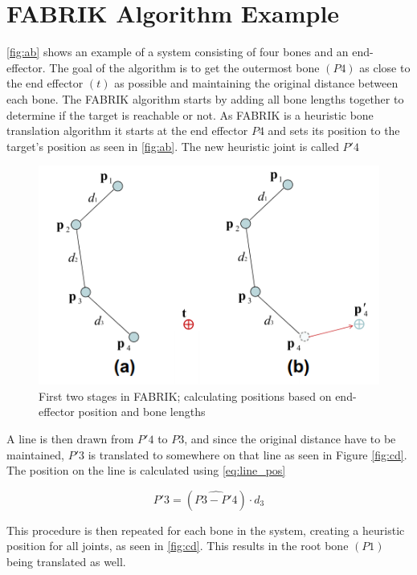 \section*{FABRIK Algorithm Example}
\autoref{fig:ab} shows an example of a system consisting of four bones and an end-effector. The goal of the algorithm is to get the outermost bone $ (P4) $ as close to the end effector $ (t) $ as possible and maintaining the original distance between each bone. 
The FABRIK algorithm starts by adding all bone lengths together to determine if the target is reachable or not. 
As FABRIK is a heuristic bone translation algorithm it starts at the end effector $ P4 $ and sets its position to the target's position as seen in \autoref{fig:ab}. The new heuristic joint is called $ P'4 $ 

\begin{figure}[H]
	\centering
	\includegraphics[width=\textwidth]{FABRIK/ab}
	\caption{First two stages in FABRIK; calculating positions based on end-effector position and bone lengths}
	\label{fig:ab}
\end{figure}

A line is then drawn from $ P'4 $ to $ P3 $, and since the original distance have to be maintained, $ P'3 $ is translated to somewhere on that line as seen in Figure \ref{fig:cd}. The position on the line is calculated using \autoref{eq:line_pos}

\begin{equation}\label{eq:line_pos}
	P'3 = (\hat{P3 - P'4}) \cdot d_{3}
\end{equation}


This procedure is then repeated for each bone in the system, creating a heuristic position for all joints, as seen in \autoref{fig:cd}. This results in the root bone $ (P1) $ being translated as well. 

